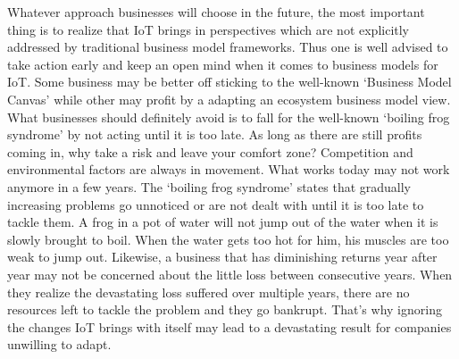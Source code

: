 		Whatever approach businesses will choose in the future, the most important thing is to realize that IoT brings in perspectives which are not explicitly addressed by traditional business model frameworks. Thus one is well advised to take action early and keep an open mind when it comes to business models for IoT. Some business may be better off sticking to the well-known `Business Model Canvas' while other may profit by a adapting an ecosystem business model view. What businesses should definitely avoid is to fall for the well-known `boiling frog syndrome' by not acting until it is too late. As long as there are still profits coming in, why take a risk and leave your comfort zone? Competition and environmental factors are always in movement. What works today may not work anymore in a few years. The `boiling frog syndrome' states that gradually increasing problems go unnoticed or are not dealt with until it is too late to tackle them. A frog in a pot of water will not jump out of the water when it is slowly brought to boil. When the water gets too hot for him, his muscles are too weak to jump out. Likewise, a business that has diminishing returns year after year may not be concerned about the little loss between consecutive years. When they realize the devastating loss suffered over multiple years, there are no resources left to tackle the problem and they go bankrupt. That's why ignoring the changes IoT brings with itself may lead to a devastating result for companies unwilling to adapt.
\vspace{-2em}
